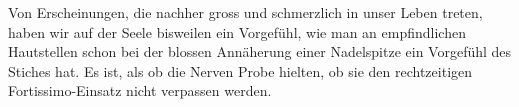 Von Erscheinungen, die nachher gross und schmerzlich in unser Leben treten, haben wir auf der Seele bisweilen ein Vorgefühl, wie man an empfindlichen Hautstellen schon bei der blossen Annäherung einer Nadelspitze ein Vorgefühl des Stiches hat. Es ist, als ob die Nerven Probe hielten, ob sie den rechtzeitigen Fortissimo-Einsatz nicht verpassen werden.
\par

